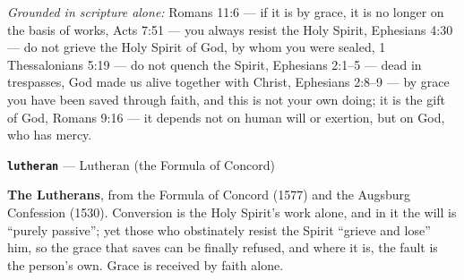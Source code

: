\documentclass[11pt]{article}
\begin{document}
\emph{Grounded in scripture alone:} Romans 11:6 — if it is by grace, it is no longer on the basis of works, Acts 7:51 — you always resist the Holy Spirit, Ephesians 4:30 — do not grieve the Holy Spirit of God, by whom you were sealed, 1 Thessalonians 5:19 — do not quench the Spirit, Ephesians 2:1–5 — dead in trespasses, God made us alive together with Christ, Ephesians 2:8–9 — by grace you have been saved through faith, and this is not your own doing; it is the gift of God, Romans 9:16 — it depends not on human will or exertion, but on God, who has mercy.
\par\medskip\noindent\textbf{\texttt{lutheran}} --- Lutheran (the Formula of Concord)\par\nobreak\noindent
\textbf{The Lutherans}, from the Formula of Concord (1577) and the Augsburg Confession (1530). Conversion is the Holy Spirit’s work alone, and in it the will is “purely passive”; yet those who obstinately resist the Spirit “grieve and lose” him, so the grace that saves can be finally refused, and where it is, the fault is the person’s own. Grace is received by faith alone.
\end{document}
